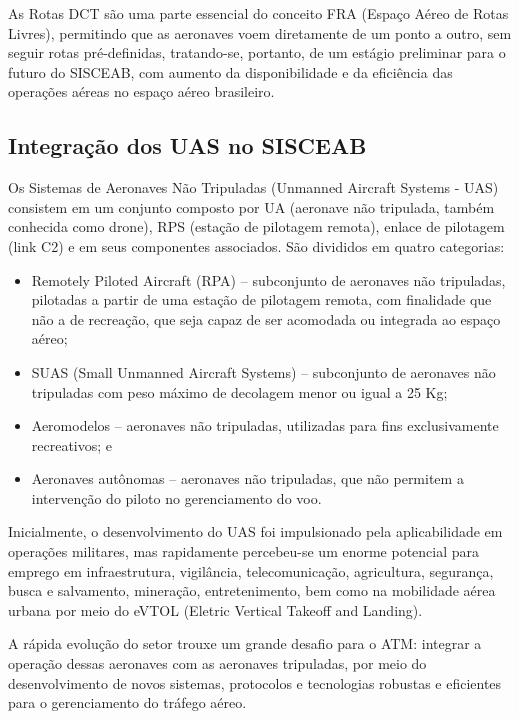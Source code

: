 \documentclass[
]{book}
\begin{document}
As Rotas DCT são uma parte essencial do conceito FRA (Espaço Aéreo de Rotas Livres), permitindo que as aeronaves voem diretamente de um ponto a outro, sem seguir rotas pré-definidas, tratando-se, portanto, de um estágio preliminar para o futuro do SISCEAB, com aumento da disponibilidade e da eficiência das operações aéreas no espaço aéreo brasileiro.

\hypertarget{integrauxe7uxe3o-dos-uas-no-sisceab}{%
\subsection{Integração dos UAS no SISCEAB}\label{integrauxe7uxe3o-dos-uas-no-sisceab}}

Os Sistemas de Aeronaves Não Tripuladas (Unmanned Aircraft Systems - UAS) consistem em um conjunto composto por UA (aeronave não tripulada, também conhecida como drone), RPS (estação de pilotagem remota), enlace de pilotagem (link C2) e em seus componentes associados. São divididos em quatro categorias:

\begin{itemize}
\item
  Remotely Piloted Aircraft (RPA) -- subconjunto de aeronaves não tripuladas, pilotadas a partir de uma estação de pilotagem remota, com finalidade que não a de recreação, que seja capaz de ser acomodada ou integrada ao espaço aéreo;
\item
  SUAS (Small Unmanned Aircraft Systems) -- subconjunto de aeronaves não tripuladas com peso máximo de decolagem menor ou igual a 25 Kg;
\item
  Aeromodelos -- aeronaves não tripuladas, utilizadas para fins exclusivamente recreativos; e
\item
  Aeronaves autônomas -- aeronaves não tripuladas, que não permitem a intervenção do piloto no gerenciamento do voo.
\end{itemize}

Inicialmente, o desenvolvimento do UAS foi impulsionado pela aplicabilidade em operações militares, mas rapidamente percebeu-se um enorme potencial para emprego em infraestrutura, vigilância, telecomunicação, agricultura, segurança, busca e salvamento, mineração, entretenimento, bem como na mobilidade aérea urbana por meio do eVTOL (Eletric Vertical Takeoff and Landing).

A rápida evolução do setor trouxe um grande desafio para o ATM: integrar a operação dessas aeronaves com as aeronaves tripuladas, por meio do desenvolvimento de novos sistemas, protocolos e tecnologias robustas e eficientes para o gerenciamento do tráfego aéreo.
\end{document}
